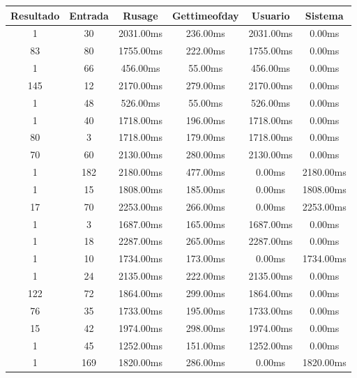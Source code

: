 \documentclass[12pt]{article}
\begin{document}
        \begin{table}[!ht]
            \centering
            \begin{tabular}{|c|c|c|c|c|c|}
                \hline
                Resultado & Entrada & Rusage & Gettimeofday & Usuario & Sistema \\ \hline
                1 & 30 & 2031.00ms & 236.00ms & 2031.00ms & 0.00ms \\ \hline
                83 & 80 & 1755.00ms & 222.00ms & 1755.00ms & 0.00ms \\ \hline
                1 & 66 & 456.00ms & 55.00ms & 456.00ms & 0.00ms \\ \hline
                145 & 12 & 2170.00ms & 279.00ms & 2170.00ms & 0.00ms \\ \hline
                1 & 48 & 526.00ms & 55.00ms & 526.00ms & 0.00ms \\ \hline
                1 & 40 & 1718.00ms & 196.00ms & 1718.00ms & 0.00ms \\ \hline
                80 & 3 & 1718.00ms & 179.00ms & 1718.00ms & 0.00ms \\ \hline
                70 & 60 & 2130.00ms & 280.00ms & 2130.00ms & 0.00ms \\ \hline
                1 & 182 & 2180.00ms & 477.00ms & 0.00ms & 2180.00ms \\ \hline
                1 & 15 & 1808.00ms & 185.00ms & 0.00ms & 1808.00ms \\ \hline
                17 & 70 & 2253.00ms & 266.00ms & 0.00ms & 2253.00ms \\ \hline
                1 & 3 & 1687.00ms & 165.00ms & 1687.00ms & 0.00ms \\ \hline
                1 & 18 & 2287.00ms & 265.00ms & 2287.00ms & 0.00ms \\ \hline
                1 & 10 & 1734.00ms & 173.00ms & 0.00ms & 1734.00ms \\ \hline
                1 & 24 & 2135.00ms & 222.00ms & 2135.00ms & 0.00ms \\ \hline
                122 & 72 & 1864.00ms & 299.00ms & 1864.00ms & 0.00ms \\ \hline
                76 & 35 & 1733.00ms & 195.00ms & 1733.00ms & 0.00ms \\ \hline
                15 & 42 & 1974.00ms & 298.00ms & 1974.00ms & 0.00ms \\ \hline
                1 & 45 & 1252.00ms & 151.00ms & 1252.00ms & 0.00ms \\ \hline
                1 & 169 & 1820.00ms & 286.00ms & 0.00ms & 1820.00ms \\ \hline

\end{tabular}
\end{table}
\end{document}
